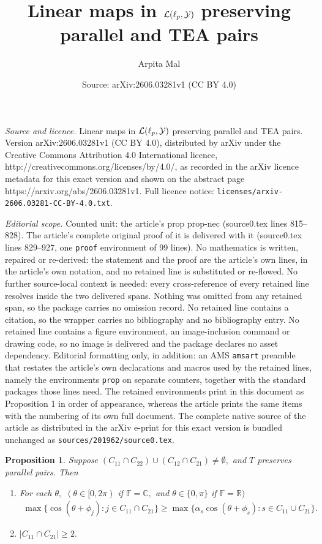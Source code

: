 \documentclass[10pt,a4paper]{amsart}
\title{Linear maps in $\mathcal{L}(\ell_{\MakeLowercase{p}},\mathcal{Y}) $ preserving parallel and TEA pairs}
\author{Arpita Mal}
\date{Source: arXiv:2606.03281v1 (CC BY 4.0)}
\newtheorem{prop}{Proposition}
\begin{document}
\maketitle

\noindent\emph{Source and licence.} Linear maps in $\mathcal{L}(\ell_{\MakeLowercase{p}},\mathcal{Y}) $ preserving parallel and TEA pairs. Version arXiv:2606.03281v1 (CC BY 4.0), distributed by arXiv under the Creative Commons Attribution 4.0 International licence, http://creativecommons.org/licenses/by/4.0/, as recorded in the arXiv licence metadata for this exact version and shown on the abstract page https://arxiv.org/abs/2606.03281v1. Full licence notice: \texttt{licenses/arxiv-2606.03281-CC-BY-4.0.txt}.\par\smallskip

\noindent\textit{Editorial scope.} Counted unit: the article's prop prop-nec (source0.tex lines 815--828). The article's complete original proof of it is delivered with it (source0.tex lines 829--927, one \texttt{proof} environment of 99 lines). No mathematics is written, repaired or re-derived: the statement and the proof are the article's own lines, in the article's own notation, and no retained line is substituted or re-flowed.  No further source-local context is needed: every cross-reference of every retained line resolves inside the two delivered spans.  Nothing was omitted from any retained span, so the package carries no omission record.  No retained line contains a citation, so the wrapper carries no bibliography and no bibliography entry.  No retained line contains a figure environment, an image-inclusion command or drawing code, so no image is delivered and the package declares no asset dependency.  Editorial formatting only, in addition: an AMS \texttt{amsart} preamble that restates the article's own declarations and macros used by the retained lines, namely the environments \texttt{prop} on separate counters, together with the standard packages those lines need.  The retained environments print in this document as Proposition 1 in order of appearance, whereas the article prints the same items with the numbering of its own full document.  The complete native source of the article as distributed in the arXiv e-print for this exact version is bundled unchanged as \texttt{sources/201962/source0.tex}.
\begin{prop}\label{prop-nec}
	Suppose $(C_{11}\cap C_{22})\cup (C_{12}\cap C_{21})\neq \emptyset,$ and $T$ preserves parallel pairs. %
	Then 
\begin{enumerate}
\item For each $\theta,$ $(\theta\in [0,2\pi)$ if $\mathbb{F}=\mathbb{C},$ and $\theta\in \{0,\pi\}$ if $\mathbb{F}=\mathbb{R})$ 
\begin{equation}\label{eq-06}
	\begin{split}
\max\{\cos(\theta+\phi_j):j\in C_{11}\cap C_{21}\}
\geq  \max\Big\{\alpha_s\cos(\theta+\phi_s):s\in C_{11}\cup C_{21}\Big\}.	
\end{split}
\end{equation}	
\item $|C_{11}\cap C_{21}|\geq 2.$
\end{enumerate}
\end{prop}
\end{document}
